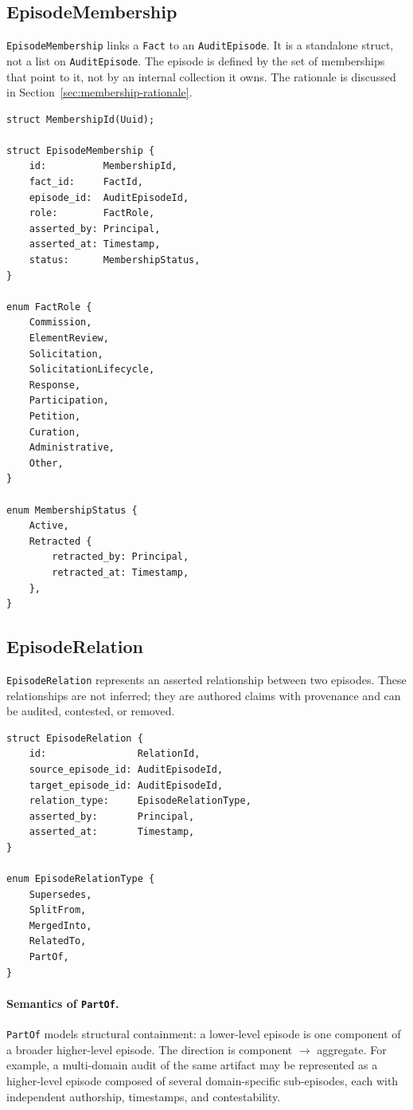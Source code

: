 \documentclass[11pt]{article}
\begin{document}
\subsection{EpisodeMembership}

\texttt{EpisodeMembership} links a \texttt{Fact} to an \texttt{AuditEpisode}.
It is a standalone struct, not a list on \texttt{AuditEpisode}. The episode is
defined by the set of memberships that point to it, not by an internal
collection it owns. The rationale is discussed in
Section~\ref{sec:membership-rationale}.

\begin{lstlisting}
struct MembershipId(Uuid);

struct EpisodeMembership {
    id:          MembershipId,
    fact_id:     FactId,
    episode_id:  AuditEpisodeId,
    role:        FactRole,
    asserted_by: Principal,
    asserted_at: Timestamp,
    status:      MembershipStatus,
}

enum FactRole {
    Commission,
    ElementReview,
    Solicitation,
    SolicitationLifecycle,
    Response,
    Participation,
    Petition,
    Curation,
    Administrative,
    Other,
}

enum MembershipStatus {
    Active,
    Retracted {
        retracted_by: Principal,
        retracted_at: Timestamp,
    },
}
\end{lstlisting}

\subsection{EpisodeRelation}

\texttt{EpisodeRelation} represents an asserted relationship between two
episodes. These relationships are not inferred; they are authored claims with
provenance and can be audited, contested, or removed.

\begin{lstlisting}
struct EpisodeRelation {
    id:                RelationId,
    source_episode_id: AuditEpisodeId,
    target_episode_id: AuditEpisodeId,
    relation_type:     EpisodeRelationType,
    asserted_by:       Principal,
    asserted_at:       Timestamp,
}

enum EpisodeRelationType {
    Supersedes,
    SplitFrom,
    MergedInto,
    RelatedTo,
    PartOf,
}
\end{lstlisting}

\paragraph{Semantics of \texttt{PartOf}.} \texttt{PartOf} models structural
containment: a lower-level episode is one component of a broader higher-level
episode. The direction is component $\to$ aggregate. For example, a multi-domain
audit of the same artifact may be represented as a higher-level episode composed
of several domain-specific sub-episodes, each with independent authorship,
timestamps, and contestability.
\end{document}
